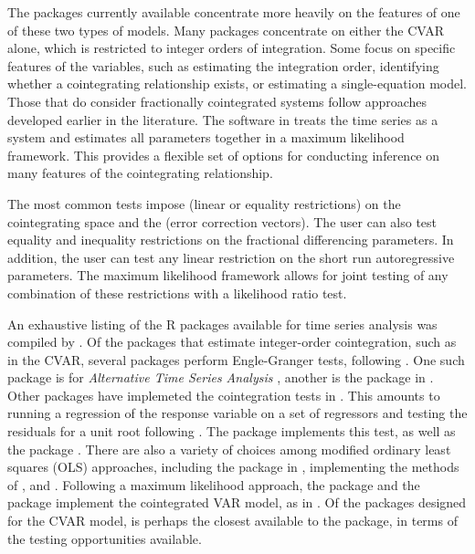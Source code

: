\documentclass[article]{jss}
\begin{document}
The packages currently available concentrate more heavily on the features of one of these two types of models. 
% 
Many packages concentrate on either the CVAR alone, which is restricted to integer orders of integration. Some focus on specific features of the variables, such as estimating the integration order, identifying whether a  cointegrating relationship exists, or estimating a single-equation model. 
Those that do consider fractionally cointegrated systems follow approaches developed earlier in the literature. 
The software in  treats the time series as a system and estimates all parameters together in a maximum likelihood framework. 
This provides a flexible set of options for conducting inference on many features of the cointegrating relationship. 

The most common tests impose (linear or equality restrictions) on the cointegrating space and the (error correction vectors). 
The user can also test equality and inequality restrictions on the fractional differencing parameters. 
In addition, the user can test any linear restriction on the short run autoregressive parameters. 
The maximum likelihood framework allows for joint testing of any combination of these restrictions with a likelihood ratio test. 



An exhaustive listing of the R packages \citep{R} available for time series analysis was compiled by 
\citet{Hyndman2020}.
% 
Of the packages that estimate integer-order cointegration, such as in the CVAR, several packages perform Engle-Granger tests, following \citet{EngleGranger1987}. 
One such package is  for \emph{Alternative Time Series Analysis} \citep{aTSA2015}, 
% 
another is the  package in \citep{egcm2017}. 
% 
Other packages have implemeted the cointegration tests in \citet{PhillipsOuliaris1990}. 
This amounts to running a regression of the response variable on a set of regressors and testing the residuals for a unit root following \cite{PhillipsPerron1988}. 
The  package \citep{tseries2019} implements this test, 
as well as the  package \citep{urca2016}. 
% 
There are also a variety of choices among modified ordinary least squares (OLS) approaches, 
including the  package in \cite{cointReg2016}, implementing the methods of \citet{PhillipsHansen1990} \citet{PhillipsLoretan1991}, \citet{Saikkonen1991} and \citet{StockWatson1993}. 
% 
Following a maximum likelihood approach, 
the  package and the  package
implement the cointegrated VAR model, as in \citet{Johansen1995}. 
Of the packages designed for the CVAR model, 
 is perhaps the closest available to the  package, in terms of the testing opportunities available.
\end{document}
